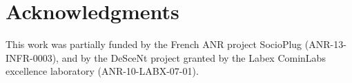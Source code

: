 
\section*{Acknowledgments}

This work was partially funded by the French ANR project SocioPlug
(ANR-13-INFR-0003), and by the DeSceNt project granted by the Labex CominLabs
excellence laboratory (ANR-10-LABX-07-01).

